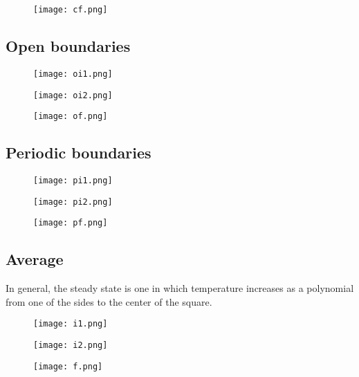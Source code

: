 \documentclass[]{article}
\begin{document}
	\begin{figure}[H]{
		\begin{center}
		\texttt{[image: cf.png]}
		\end{center}
	}\end{figure}
	
\subsection{Open boundaries}
	\begin{figure}[H]{
		\begin{center}
		\texttt{[image: oi1.png]}
		\end{center}
	}\end{figure}

	\begin{figure}[H]{
		\begin{center}
		\texttt{[image: oi2.png]}
		\end{center}
	}\end{figure}
	
	\begin{figure}[H]{
		\begin{center}
		\texttt{[image: of.png]}
		\end{center}
	}\end{figure}
\subsection{Periodic boundaries}
	\begin{figure}[H]{
		\begin{center}
		\texttt{[image: pi1.png]}
		\end{center}
	}\end{figure}

	\begin{figure}[H]{
		\begin{center}
		\texttt{[image: pi2.png]}
		\end{center}
	}\end{figure}
	
	\begin{figure}[H]{
		\begin{center}
		\texttt{[image: pf.png]}
		\end{center}
	}\end{figure}
\subsection{Average}
In general, the steady state is one in which temperature increases as a polynomial from one of the sides to the center of the square.
	\begin{figure}[H]{
		\begin{center}
		\texttt{[image: i1.png]}
		\end{center}
	}\end{figure}

	\begin{figure}[H]{
		\begin{center}
		\texttt{[image: i2.png]}
		\end{center}
	}\end{figure}
	
	\begin{figure}[H]{
		\begin{center}
		\texttt{[image: f.png]}
		\end{center}
	}\end{figure}

	
\end{document}
